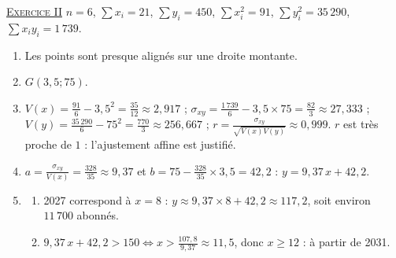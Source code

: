 \begin{corrige}
\noindent \underline{\textsc{Exercice II}} \newline
$n = 6$, $\sum x_i = 21$, $\sum y_i = 450$, $\sum x_i^2 = 91$, $\sum y_i^2 = 35\,290$, $\sum x_i y_i = 1\,739$.
\begin{enumerate}
\item Les points sont presque align\'es sur une droite montante.
\item $G(3{,}5 ; 75)$.
\item $V(x) = \frac{91}{6} - 3{,}5^2 = \frac{35}{12} \approx 2{,}917$ ; $\sigma_{xy} = \frac{1\,739}{6} - 3{,}5 \times 75 = \frac{82}{3} \approx 27{,}333$ ;
      $V(y) = \frac{35\,290}{6} - 75^2 = \frac{770}{3} \approx 256{,}667$ ; $r = \frac{\sigma_{xy}}{\sqrt{V(x)V(y)}} \approx 0{,}999$.
      $r$ est tr\`es proche de $1$ : l'ajustement affine est justifi\'e.
\item $a = \frac{\sigma_{xy}}{V(x)} = \frac{328}{35} \approx 9{,}37$ et $b = 75 - \frac{328}{35} \times 3{,}5 = 42{,}2$ :
      $\boxed{y = 9{,}37\,x + 42{,}2}$.
\item \begin{enumerate}
      \item 2027 correspond \`a $x = 8$ : $y \approx 9{,}37 \times 8 + 42{,}2 \approx 117{,}2$, soit environ $11\,700$ abonn\'es.
      \item $9{,}37\,x + 42{,}2 > 150 \iff x > \frac{107{,}8}{9{,}37} \approx 11{,}5$, donc $x \geq 12$ : \`a partir de 2031.
      \end{enumerate}
\end{enumerate}


\end{corrige}
